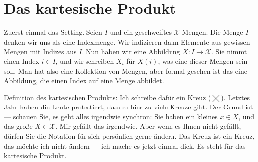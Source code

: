 \begin{math-stroke}
\begin{center}
\end{center}
\end{math-stroke}

\section{Das kartesische Produkt}

\begin{spoken-clean}[00:17:28 - 00:20:25]
Zuerst einmal das Setting. Seien $I$ und ein geschweiftes $\mathcal{X}$ Mengen. Die Menge $I$ denken wir uns als eine Indexmenge. Wir indizieren dann Elemente aus gewissen Mengen mit Indizes aus $I$. Nun haben wir eine Abbildung $X \colon I \to \mathcal{X}$. Sie nimmt einen Index $i \in I$, und wir schreiben $X_i$ für $X(i)$, was eine dieser Mengen sein soll. Man hat also eine Kollektion von Mengen, aber formal gesehen ist das eine Abbildung, die einen Index auf eine Menge abbildet.

Definition des kartesischen Produkts: Ich schreibe dafür ein Kreuz ($\bigtimes$). Letztes Jahr haben die Leute protestiert, dass es hier zu viele Kreuze gibt. Der Grund ist --- schauen Sie, es geht alles irgendwie synchron: Sie haben ein kleines $x \in X$, und das große $X \in \mathcal{X}$. Mir gefällt das irgendwie. Aber wenn es Ihnen nicht gefällt, dürfen Sie die Notation für sich persönlich gerne ändern. Das Kreuz ist ein Kreuz, das möchte ich nicht ändern --- ich mache es jetzt einmal dick. Es steht für das kartesische Produkt.
\end{spoken-clean}

